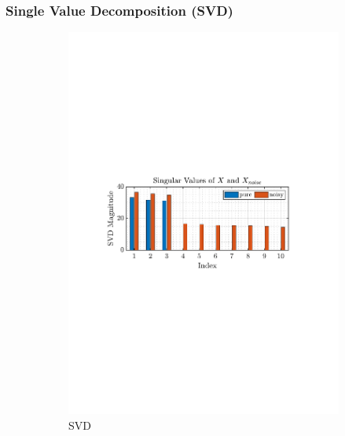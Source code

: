 \documentclass[12pt]{article}
\numberwithin{equation}{section}
\begin{document}
	 	\subsubsection{Single Value Decomposition (SVD)}
			\begin{figure}[H]
				\centering
				\begin{subfigure}{0.49\textwidth}
					\centering
					\includegraphics[trim={2.2cm 11.2cm 3.15cm  11.2cm}, clip, width=\textwidth]{../MATLAB/figures/q1_6a_fig01.pdf} 
					\captionsetup{justification=centering}
					\caption{SVD}
				\end{subfigure}
				\begin{subfigure}{0.49\textwidth}
					\centering

\end{subfigure}
\end{figure}
\end{document}
